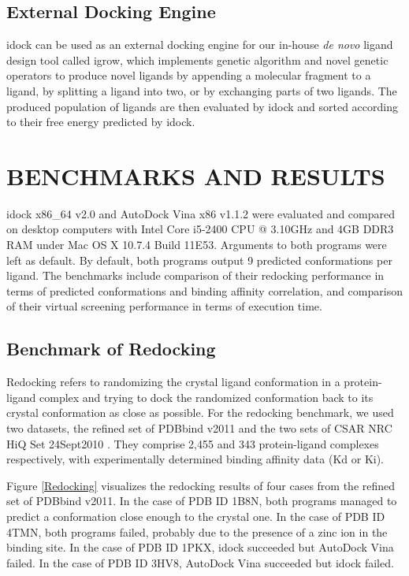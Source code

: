 \documentclass[12pt]{article}
\begin{document}
\subsection*{\sffamily \large External Docking Engine}

idock can be used as an external docking engine for our in-house \textit{de novo} ligand design tool called igrow, which implements genetic algorithm and novel genetic operators to produce novel ligands by appending a molecular fragment to a ligand, by splitting a ligand into two, or by exchanging parts of two ligands. The produced population of ligands are then evaluated by idock and sorted according to their free energy predicted by idock.

\section*{\sffamily \Large BENCHMARKS AND RESULTS}

idock x86\_64 v2.0 and AutoDock Vina x86 v1.1.2 were evaluated and compared on desktop computers with Intel Core i5-2400 CPU @ 3.10GHz and 4GB DDR3 RAM under Mac OS X 10.7.4 Build 11E53. Arguments to both programs were left as default. By default, both programs output 9 predicted conformations per ligand. The benchmarks include comparison of their redocking performance in terms of predicted conformations and binding affinity correlation, and comparison of their virtual screening performance in terms of execution time.

\subsection*{\sffamily \large Benchmark of Redocking}

Redocking refers to randomizing the crystal ligand conformation in a protein-ligand complex and trying to dock the randomized conformation back to its crystal conformation as close as possible. For the redocking benchmark, we used two datasets, the refined set of PDBbind v2011 \citep{529,530} and the two sets of CSAR NRC HiQ Set 24Sept2010 \citep{857,960}. They comprise 2,455 and 343 protein-ligand complexes respectively, with experimentally determined binding affinity data (Kd or Ki).

Figure \ref{Redocking} visualizes the redocking results of four cases from the refined set of PDBbind v2011. In the case of PDB ID 1B8N, both programs managed to predict a conformation close enough to the crystal one. In the case of PDB ID 4TMN, both programs failed, probably due to the presence of a zinc ion in the binding site. In the case of PDB ID 1PKX, idock succeeded but AutoDock Vina failed. In the case of PDB ID 3HV8, AutoDock Vina succeeded but idock failed.
\end{document}
